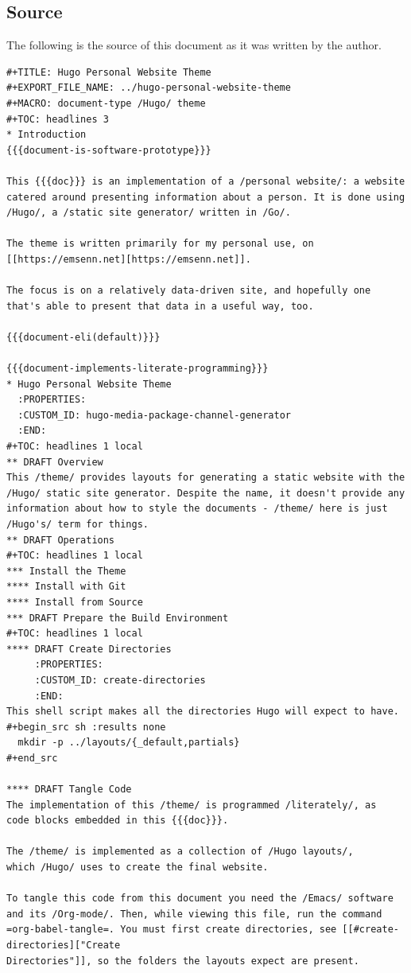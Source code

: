 \documentclass[11pt]{article}
\begin{document}
\subsection*{Source}
\label{sec:org8e1a29e}
The following is the source of this document as it was written by the
author.
\begin{verbatim}
#+TITLE: Hugo Personal Website Theme
#+EXPORT_FILE_NAME: ../hugo-personal-website-theme
#+MACRO: document-type /Hugo/ theme
#+TOC: headlines 3
* Introduction
{{{document-is-software-prototype}}}

This {{{doc}}} is an implementation of a /personal website/: a website
catered around presenting information about a person. It is done using
/Hugo/, a /static site generator/ written in /Go/.

The theme is written primarily for my personal use, on
[[https://emsenn.net][https://emsenn.net]].

The focus is on a relatively data-driven site, and hopefully one
that's able to present that data in a useful way, too.

{{{document-eli(default)}}}

{{{document-implements-literate-programming}}}
* Hugo Personal Website Theme
  :PROPERTIES:
  :CUSTOM_ID: hugo-media-package-channel-generator
  :END:
#+TOC: headlines 1 local
** DRAFT Overview
This /theme/ provides layouts for generating a static website with the
/Hugo/ static site generator. Despite the name, it doesn't provide any
information about how to style the documents - /theme/ here is just
/Hugo's/ term for things.
** DRAFT Operations
#+TOC: headlines 1 local
*** Install the Theme
**** Install with Git
**** Install from Source
*** DRAFT Prepare the Build Environment
#+TOC: headlines 1 local
**** DRAFT Create Directories
     :PROPERTIES:
     :CUSTOM_ID: create-directories
     :END:
This shell script makes all the directories Hugo will expect to have.
#+begin_src sh :results none
  mkdir -p ../layouts/{_default,partials}
#+end_src

**** DRAFT Tangle Code
The implementation of this /theme/ is programmed /literately/, as
code blocks embedded in this {{{doc}}}.

The /theme/ is implemented as a collection of /Hugo layouts/,
which /Hugo/ uses to create the final website.

To tangle this code from this document you need the /Emacs/ software
and its /Org-mode/. Then, while viewing this file, run the command
=org-babel-tangle=. You must first create directories, see [[#create-directories]["Create
Directories"]], so the folders the layouts expect are present.


\end{verbatim}
\end{document}
